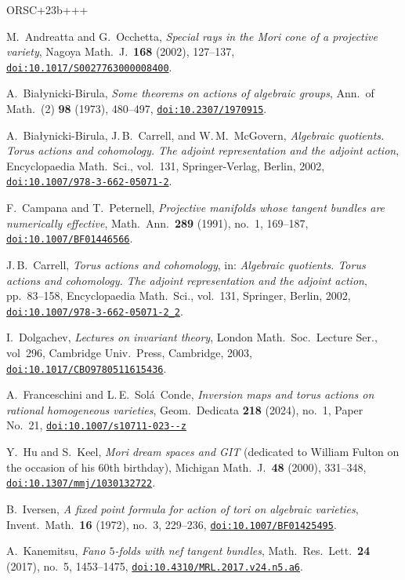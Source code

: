\documentclass[10pt,a4paper]{article}
\numberwithin{equation}{section}
\theoremstyle{definition}
\theoremstyle{remark}
\providecommand{\etalchar}[1]{#1}
\providecommand{\doi}[2][]{\href{https://doi.org/#2}{\nolinkurl{doi:#2}}}
\begin{document}
\begin{thebibliography}{ORSC\etalchar{+}23b+++}

M.~Andreatta and G.~Occhetta, 
\emph{Special rays in the Mori cone of a projective variety}, 
Nagoya Math.~J.\ \textbf{168} (2002), 127--137,
\doi{10.1017/S0027763000008400}.

A.~Bia{\l}ynicki-Birula, 
\emph{Some theorems on actions of algebraic groups},
Ann.\ of Math.~(2) \textbf{98} (1973), 480--497,
\doi{10.2307/1970915}.

A.~Bia{\l}ynicki-Birula, J.\,B.~Carrell, and W.\,M.~McGovern, 
\emph{Algebraic quotients. Torus actions and cohomology. The
adjoint representation and the adjoint action}, Encyclopaedia Math.\ Sci.,
vol.~131, 
Springer-Verlag, Berlin, 2002,
\doi{10.1007/978-3-662-05071-2}.

F.~Campana and T.~Peternell, 
\emph{Projective manifolds whose tangent bundles are numerically effective}, 
Math.\ Ann.\ \textbf{289} (1991), no.~1, 169--187,
\doi{10.1007/BF01446566}.

J.\,B.~Carrell, 
\emph{Torus actions and cohomology}, 
in: \emph{Algebraic quotients. Torus actions and cohomology. The
  adjoint representation and the adjoint action}, pp.~83--158,
Encyclopaedia Math.\ Sci., vol.~131, Springer, Berlin, 2002,
\doi{10.1007/978-3-662-05071-2\_2}.

I.~Dolgachev, 
\emph{Lectures on invariant theory},
London Math.\ Soc.\ Lecture Ser., 
vol~296, 
Cambridge Univ.\ Press, Cambridge, 2003,
\doi{10.1017/CBO9780511615436}.

A.~Franceschini and L.\,E.~Sol\'{a}~Conde, 
\emph{Inversion maps and torus actions on rational homogeneous va\-ri\-e\-ties}, Geom.\ Dedicata \textbf{218} (2024), no.~1,
Paper No.~21, \href{https://doi.org/10.1007/s10711-023-00866-z}{\texttt{doi:10.1007/s10711-023--z}}

Y.~Hu and S.~Keel,
\emph{Mori dream spaces and GIT} (dedicated to William Fulton on the occasion of his 60th birthday),
Michigan Math.~J.\ \textbf{48} (2000), 331--348,
\doi{10.1307/mmj/1030132722}.

B.~Iversen, 
\emph{A fixed point formula for action of tori on algebraic varieties},
Invent.\ Math.\ \textbf{16} (1972), no.~3, 229--236,
\doi{10.1007/BF01425495}.

A.~Kanemitsu,
\emph{Fano $5$-folds with nef tangent bundles}, 
Math.\ Res.\ Lett.\ \textbf{24} (2017), no.~5, 1453--1475,
\doi{10.4310/MRL.2017.v24.n5.a6}.


\end{thebibliography}
\end{document}
